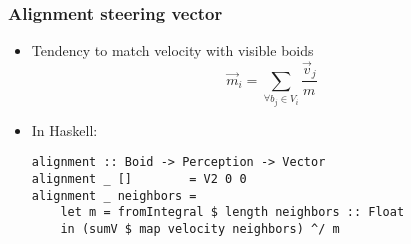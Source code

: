 \documentclass{beamer}
\begin{document}
\begin{frame}[fragile]
    \frametitle{\huge{Alignment steering vector}\normalsize}
    \begin{itemize}
    \item Tendency to match velocity with visible boids
    \begin{equation*}
    \vec{m}_i = \sum\limits_{\forall b_j \in V_i} \frac{\vec{v}_j}{m}
    \end{equation*}
    \item In Haskell:
    \begin{verbatim}
alignment :: Boid -> Perception -> Vector
alignment _ []        = V2 0 0
alignment _ neighbors =
    let m = fromIntegral $ length neighbors :: Float
    in (sumV $ map velocity neighbors) ^/ m
    \end{verbatim}
    \end{itemize}

\end{frame}
\end{document}
